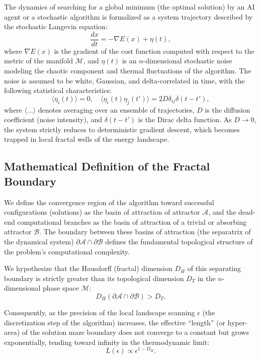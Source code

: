 \documentclass[12pt,a4paper]{article}
\begin{document}
The dynamics of searching for a global minimum (the optimal solution) by an AI agent or a stochastic algorithm is formalized as a system trajectory described by the stochastic Langevin equation:
\begin{equation}
\frac{dx}{dt} = -\nabla E(x) + \eta(t),
\end{equation}
where $\nabla E(x)$ is the gradient of the cost function computed with respect to the metric of the manifold $\mathcal{M}$, and $\eta(t)$ is an $n$-dimensional stochastic noise modeling the chaotic component and thermal fluctuations of the algorithm. The noise is assumed to be white, Gaussian, and delta-correlated in time, with the following statistical characteristics:
\begin{equation}
\langle \eta_i(t) \rangle = 0, \quad \langle \eta_i(t)\eta_j(t') \rangle = 2D\delta_{ij}\delta(t - t'),
\end{equation}
where $\langle \dots \rangle$ denotes averaging over an ensemble of trajectories, $D$ is the diffusion coefficient (noise intensity), and $\delta(t - t')$ is the Dirac delta function. As $D \to 0$, the system strictly reduces to deterministic gradient descent, which becomes trapped in local fractal wells of the energy landscape.

\subsection{Mathematical Definition of the Fractal Boundary}

We define the convergence region of the algorithm toward successful configurations (solutions) as the basin of attraction of attractor $\mathcal{A}$, and the dead-end computational branches as the basin of attraction of a trivial or absorbing attractor $\mathcal{B}$. The boundary between these basins of attraction (the separatrix of the dynamical system) $\partial\mathcal{A} \cap \partial\mathcal{B}$ defines the fundamental topological structure of the problem's computational complexity.

We hypothesize that the Hausdorff (fractal) dimension $D_H$ of this separating boundary is strictly greater than its topological dimension $D_T$ in the $n$-dimensional phase space $\mathcal{M}$:
\begin{equation}
D_H(\partial\mathcal{A} \cap \partial\mathcal{B}) > D_T.
\end{equation}

Consequently, as the precision of the local landscape scanning $\epsilon$ (the discretization step of the algorithm) increases, the effective ``length'' (or hyper-area) of the solution maze boundary does not converge to a constant but grows exponentially, tending toward infinity in the thermodynamic limit:
\begin{equation}
L(\epsilon) \propto \epsilon^{1 - D_H}.
\end{equation}
\end{document}
